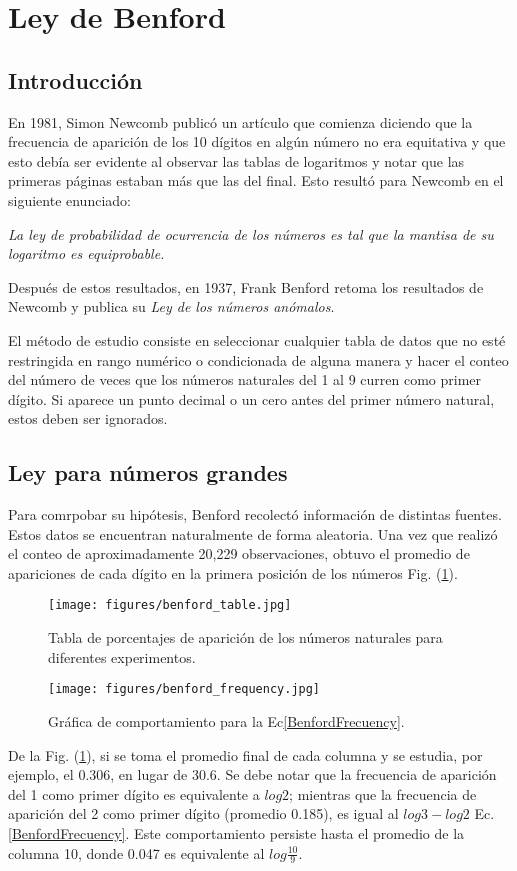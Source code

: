 \newpage
\section{Ley de Benford}
\subsection{Introducción}
En 1981, Simon Newcomb publicó un art\'iculo que comienza diciendo que la
frecuencia de aparición de los 10 dígitos en algún número no era equitativa y
que esto debía ser evidente al observar las tablas de logaritmos y notar que las
primeras p\'aginas estaban m\'as que las del final. Esto result\'o para Newcomb
en el siguiente enunciado:

\textit{La ley de probabilidad de ocurrencia de los n\'umeros es tal que la mantisa 
de su logaritmo es equiprobable.}

Despu\'es de estos resultados, en 1937, Frank Benford retoma los resultados de
Newcomb y publica su \textit{Ley de los n\'umeros an\'omalos}.

El m\'etodo de estudio consiste en seleccionar cualquier tabla de datos que no
esté restringida en rango numérico o condicionada de alguna manera y hacer el
conteo del n\'umero de veces que los n\'umeros naturales del 1 al 9 curren como
primer dígito. Si aparece un punto decimal o un cero antes del primer n\'umero
natural, estos deben ser ignorados.
\subsection{Ley para n\'umeros grandes}
Para comrpobar su hip\'otesis, Benford recolectó informaci\'on de distintas
fuentes. Estos datos se encuentran naturalmente de forma aleatoria. Una vez que
realizó el conteo de aproximadamente 20,229 observaciones, obtuvo el promedio de
apariciones de cada dígito en la primera posici\'on de los n\'umeros
Fig. (\ref{T1Benford}). 

\begin{figure}[h]
	\centering
	\texttt{[image: figures/benford\_table.jpg]}
	\caption{Tabla de porcentajes de aparici\'on de los n\'umeros naturales para diferentes experimentos.}
	\label{T1Benford}
\end{figure}

\begin{figure}[h]
	\centering
	\texttt{[image: figures/benford\_frequency.jpg]}
\caption{Gr\'afica de comportamiento para la Ec\eqref{BenfordFrecuency}.}
	\label{G1Benford}
\end{figure}
De la Fig. (\ref{T1Benford}), si se toma el promedio final de cada columna y se
estudia, por ejemplo, el 0.306, en lugar de 30.6. Se debe notar que la
frecuencia de aparici\'on del 1 como primer dígito es equivalente a $log 2$;
mientras que la frecuencia de aparici\'on del 2 como primer d\'igito (promedio
0.185), es igual al $log 3-log 2$ Ec.\eqref{BenfordFrecuency}. Este
comportamiento persiste hasta el promedio de la columna 10, donde 0.047 es
equivalente al $log \frac{10}{9}$.

